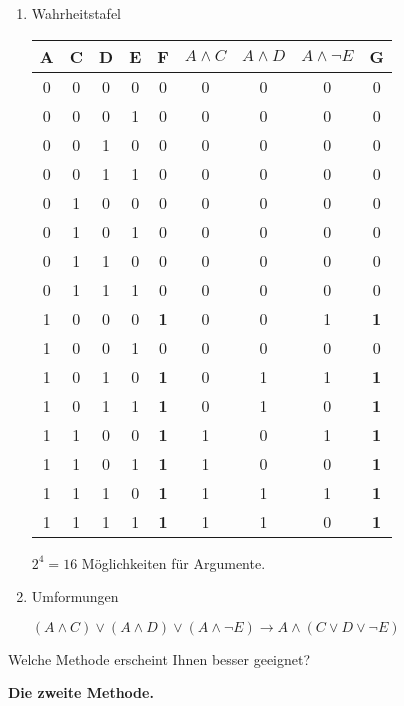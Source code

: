 \documentclass[12pt]{article}
\begin{document}
  \begin{enumerate}[label=(\roman*)]
    \item Wahrheitstafel
    \begin{center}
      \begin{tabular}{ |c c c c|c|c c c c| } 
        \hline
        A & C & D & E & \textbf{F} & \(A \wedge C\) & \(A \wedge D\) & \(A \wedge \neg E\) & \textbf{G} \\
        \hline
        0 & 0 & 0 & 0 & 0 & 0 & 0 & 0 & 0 \\
        0 & 0 & 0 & 1 & 0 & 0 & 0 & 0 & 0 \\
        0 & 0 & 1 & 0 & 0 & 0 & 0 & 0 & 0 \\
        0 & 0 & 1 & 1 & 0 & 0 & 0 & 0 & 0 \\
        0 & 1 & 0 & 0 & 0 & 0 & 0 & 0 & 0 \\
        0 & 1 & 0 & 1 & 0 & 0 & 0 & 0 & 0 \\
        0 & 1 & 1 & 0 & 0 & 0 & 0 & 0 & 0 \\
        0 & 1 & 1 & 1 & 0 & 0 & 0 & 0 & 0 \\
        1 & 0 & 0 & 0 & \textbf{1} & 0 & 0 & 1 & \textbf{1} \\
        1 & 0 & 0 & 1 & 0 & 0 & 0 & 0 & 0 \\
        1 & 0 & 1 & 0 & \textbf{1} & 0 & 1 & 1 & \textbf{1} \\
        1 & 0 & 1 & 1 & \textbf{1} & 0 & 1 & 0 & \textbf{1} \\
        1 & 1 & 0 & 0 & \textbf{1} & 1 & 0 & 1 & \textbf{1} \\
        1 & 1 & 0 & 1 & \textbf{1} & 1 & 0 & 0 & \textbf{1} \\
        1 & 1 & 1 & 0 & \textbf{1} & 1 & 1 & 1 & \textbf{1} \\
        1 & 1 & 1 & 1 & \textbf{1} & 1 & 1 & 0 & \textbf{1} \\
        \hline
      \end{tabular}
    \end{center}
    \(2^4 = 16\) Möglichkeiten für Argumente.

    \item Umformungen\par
    \((A \wedge C) \vee (A \wedge D) \vee (A \wedge \neg E) \rightarrow A \wedge (C \vee D \vee \neg E)\)\par
    
  \end{enumerate}

  Welche Methode erscheint Ihnen besser geeignet?\par
  \textbf{Die zweite Methode.}
\end{document}
